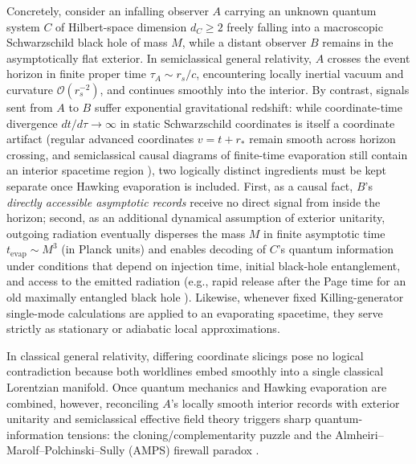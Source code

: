\documentclass[11pt,a4paper]{article}
\theoremstyle{definition}
\theoremstyle{remark}
\newcommand{\1}{\mathbf{1}}
\begin{document}
Concretely, consider an infalling observer $A$ carrying an unknown quantum system $C$ of Hilbert-space dimension $d_C \ge 2$ freely falling into a macroscopic Schwarzschild black hole of mass $M$, while a distant observer $B$ remains in the asymptotically flat exterior. In semiclassical general relativity, $A$ crosses the event horizon in finite proper time $\tau_A \sim r_s / c$, encountering locally inertial vacuum and curvature $\mathcal{O}(r_s^{-2})$, and continues smoothly into the interior. By contrast, signals sent from $A$ to $B$ suffer exponential gravitational redshift: while coordinate-time divergence $dt/d\tau \to \infty$ in static Schwarzschild coordinates is itself a coordinate artifact (regular advanced coordinates $v = t + r_*$ remain smooth across horizon crossing, and semiclassical causal diagrams of finite-time evaporation still contain an interior spacetime region \cite{UnruhWald2017}), two logically distinct ingredients must be kept separate once Hawking evaporation \cite{Hawking1975,Page1976,Page1993} is included. First, as a causal fact, $B$'s \emph{directly accessible asymptotic records} receive no direct signal from inside the horizon; second, as an additional dynamical assumption of exterior unitarity, outgoing radiation eventually disperses the mass $M$ in finite asymptotic time $t_{\mathrm{evap}} \sim M^3$ (in Planck units) and enables decoding of $C$'s quantum information under conditions that depend on injection time, initial black-hole entanglement, and access to the emitted radiation (e.g., rapid release after the Page time for an old maximally entangled black hole \cite{HaydenPreskill2007,Penington2020,AlmheiriIslands2020}). Likewise, whenever fixed Killing-generator single-mode calculations are applied to an evaporating spacetime, they serve strictly as stationary or adiabatic local approximations.

In classical general relativity, differing coordinate slicings pose no logical contradiction because both worldlines embed smoothly into a single classical Lorentzian manifold. Once quantum mechanics and Hawking evaporation are combined, however, reconciling $A$'s locally smooth interior records with exterior unitarity and semiclassical effective field theory triggers sharp quantum-information tensions: the cloning/complementarity puzzle \cite{Susskind1993,Nomura2013,Nomura2013PRD} and the Almheiri--Marolf--Polchinski--Sully (AMPS) firewall paradox \cite{AMPS2013}.
\end{document}
